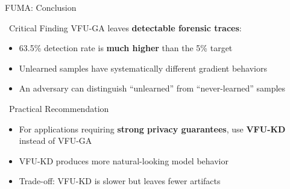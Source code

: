 \documentclass[aspectratio=169, 11pt]{beamer}
\begin{document}
\begin{frame}{FUMA: Conclusion}
    \begin{alertblock}{\faExclamationTriangle\ Critical Finding}
        VFU-GA leaves \textbf{detectable forensic traces}:
        \begin{itemize}
            \item 63.5\% detection rate is \textbf{much higher} than the 5\% target
            \item Unlearned samples have systematically different gradient behaviors
            \item An adversary can distinguish ``unlearned'' from ``never-learned'' samples
        \end{itemize}
    \end{alertblock}
    
    \vspace{0.5em}
    \begin{exampleblock}{\faLightbulb\ Practical Recommendation}
        \begin{itemize}
            \item For applications requiring \textbf{strong privacy guarantees}, use \textbf{VFU-KD} instead of VFU-GA
            \item VFU-KD produces more natural-looking model behavior
            \item Trade-off: VFU-KD is slower but leaves fewer artifacts
        \end{itemize}
    \end{exampleblock}
\end{frame}
\end{document}
